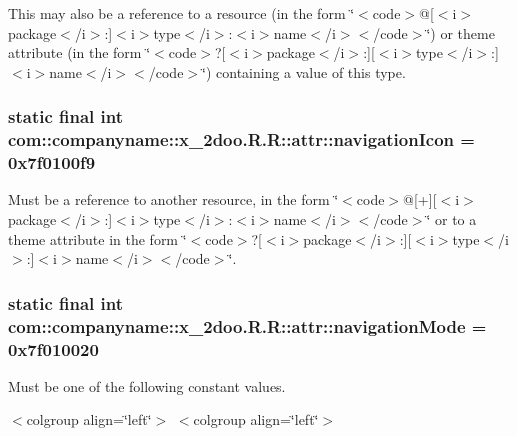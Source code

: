 This may also be a reference to a resource (in the form \char`\"{}$<$code$>$@\mbox{[}$<$i$>$package$<$/i$>$:\mbox{]}$<$i$>$type$<$/i$>$:$<$i$>$name$<$/i$>$$<$/code$>$\char`\"{}) or theme attribute (in the form \char`\"{}$<$code$>$?\mbox{[}$<$i$>$package$<$/i$>$:\mbox{]}\mbox{[}$<$i$>$type$<$/i$>$:\mbox{]}$<$i$>$name$<$/i$>$$<$/code$>$\char`\"{}) containing a value of this type. \hypertarget{classcom_1_1companyname_1_1x__2doo_1_1_r_1_1attr_208dad569cc9e2942b9337ddf6e7df8b}{
\subsubsection[{navigationIcon}]{\setlength{\rightskip}{0pt plus 5cm}static final int com::companyname::x\_\-2doo.R.R::attr::navigationIcon = 0x7f0100f9}}
\label{classcom_1_1companyname_1_1x__2doo_1_1_r_1_1attr_208dad569cc9e2942b9337ddf6e7df8b}


Must be a reference to another resource, in the form \char`\"{}$<$code$>$@\mbox{[}+\mbox{]}\mbox{[}$<$i$>$package$<$/i$>$:\mbox{]}$<$i$>$type$<$/i$>$:$<$i$>$name$<$/i$>$$<$/code$>$\char`\"{} or to a theme attribute in the form \char`\"{}$<$code$>$?\mbox{[}$<$i$>$package$<$/i$>$:\mbox{]}\mbox{[}$<$i$>$type$<$/i$>$:\mbox{]}$<$i$>$name$<$/i$>$$<$/code$>$\char`\"{}. \hypertarget{classcom_1_1companyname_1_1x__2doo_1_1_r_1_1attr_5351b043733ecb04a8772765eca6beac}{
\subsubsection[{navigationMode}]{\setlength{\rightskip}{0pt plus 5cm}static final int com::companyname::x\_\-2doo.R.R::attr::navigationMode = 0x7f010020}}
\label{classcom_1_1companyname_1_1x__2doo_1_1_r_1_1attr_5351b043733ecb04a8772765eca6beac}


Must be one of the following constant values. \begin{TabularC}{0}
\hline
\end{TabularC}
$<$colgroup align=\char`\"{}left\char`\"{}$>$ $<$colgroup align=\char`\"{}left\char`\"{}$>$ 

